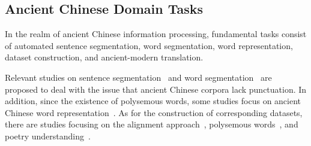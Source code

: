 
\subsection{Ancient Chinese Domain Tasks}
In the realm of ancient Chinese information processing, fundamental tasks consist of automated sentence segmentation, word segmentation, word representation, dataset construction, and ancient-modern translation.



Relevant studies on sentence segmentation~\cite{cheng-etal-2020-integration} and word segmentation~\cite{TP-toolbox-web} are proposed to deal with the issue that ancient Chinese corpora lack punctuation. In addition, since the existence of polysemous words, some studies focus on ancient Chinese word representation~\cite{shu-etal-2021-gu}. As for the construction of corresponding datasets, there are studies focusing on the alignment approach~\cite{DBLP:journals/talip/LiuYQL20}, polysemous words~\cite{DBLP:conf/naacl/PanWOK22}, and poetry understanding~\cite{Leiliu}.



